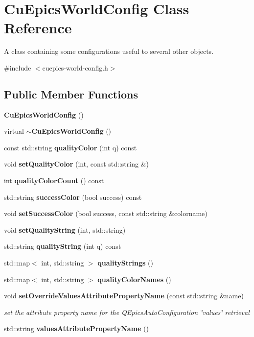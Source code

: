 \section{Cu\+Epics\+World\+Config Class Reference}
\label{classCuEpicsWorldConfig}


A class containing some configurations useful to several other objects.  




{\ttfamily \#include $<$cuepics-\/world-\/config.\+h$>$}

\subsection*{Public Member Functions}
\begin{DoxyCompactItemize}
\item 
\textbf{ Cu\+Epics\+World\+Config} ()
\item 
virtual \textbf{ $\sim$\+Cu\+Epics\+World\+Config} ()
\item 
const std\+::string \textbf{ quality\+Color} (int q) const
\item 
void \textbf{ set\+Quality\+Color} (int, const std\+::string \&)
\item 
int \textbf{ quality\+Color\+Count} () const
\item 
std\+::string \textbf{ success\+Color} (bool success) const
\item 
void \textbf{ set\+Success\+Color} (bool success, const std\+::string \&colorname)
\item 
void \textbf{ set\+Quality\+String} (int, std\+::string)
\item 
std\+::string \textbf{ quality\+String} (int q) const
\item 
std\+::map$<$ int, std\+::string $>$ \textbf{ quality\+Strings} ()
\item 
std\+::map$<$ int, std\+::string $>$ \textbf{ quality\+Color\+Names} ()
\item 
void \textbf{ set\+Override\+Values\+Attribute\+Property\+Name} (const std\+::string \&name)
\begin{DoxyCompactList}\small\item\em set the attribute property name for the Q\+Epics\+Auto\+Configuration \char`\"{}values\char`\"{} retrieval \end{DoxyCompactList}\item 
std\+::string \textbf{ values\+Attribute\+Property\+Name} ()
\end{DoxyCompactItemize}



